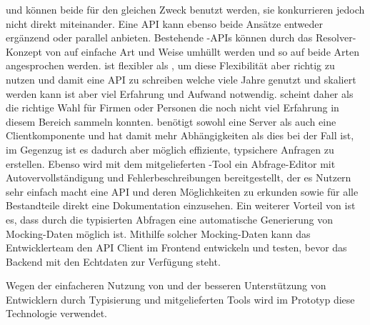  und  können beide für den gleichen Zweck benutzt werden, sie konkurrieren jedoch nicht direkt miteinander. Eine API kann ebenso beide Ansätze entweder ergänzend oder parallel anbieten. Bestehende -APIs können durch das Resolver-Konzept von  auf einfache Art und Weise umhüllt werden und so auf beide Arten angesprochen werden.  ist flexibler als , um diese Flexibilität aber richtig zu nutzen und damit eine API zu schreiben welche viele Jahre genutzt und skaliert werden kann ist aber viel Erfahrung und Aufwand notwendig.  scheint daher als die richtige Wahl für Firmen oder Personen die noch nicht viel Erfahrung in diesem Bereich sammeln konnten.  benötigt sowohl eine Server als auch eine Clientkomponente und hat damit mehr Abhängigkeiten als dies bei  der Fall ist, im Gegenzug ist es dadurch aber möglich effiziente, typsichere Anfragen zu erstellen. Ebenso wird mit dem mitgelieferten -Tool ein Abfrage-Editor mit Autovervollständigung und Fehlerbeschreibungen bereitgestellt, der es Nutzern sehr einfach macht eine API und deren Möglichkeiten zu erkunden sowie für alle Bestandteile direkt eine Dokumentation einzusehen. Ein weiterer Vorteil von  ist es, dass durch die typisierten Abfragen eine automatische Generierung von Mocking-Daten möglich ist. Mithilfe solcher Mocking-Daten kann das Entwicklerteam den API Client im Frontend entwickeln und testen, bevor das Backend mit den Echtdaten zur Verfügung steht.

Wegen der einfacheren Nutzung von  und der besseren Unterstützung von Entwicklern durch Typisierung und mitgelieferten Tools wird im Prototyp diese Technologie verwendet.
